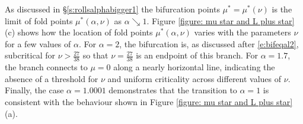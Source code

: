 \documentclass{article}
\numberwithin{equation}{section}
\begin{document}
As discussed in \S\ref{s:rollsalphabigger1} the bifurcation points $\mu^*=\mu^*(\nu)$ is the limit of fold points $\mu^*(\alpha,\nu)$ as $\alpha \searrow 1$. Figure \ref{figure: mu star and L plus star}(c) shows how the location of fold points $\mu^*(\alpha,\nu)$ varies with the parameters $\nu$ for a few values of $\alpha$. For $\alpha = 2$, the bifurcation is, as discussed after \eqref{e:bifeqal2}, subcritical for $\nu>\frac{27}{38}$ so that $\nu=\frac{27}{38}$  is an endpoint of this branch. For $\alpha = 1.7$, the branch connects to $\mu = 0$ along a nearly horizontal line, indicating the absence of a threshold for $\nu$ and uniform criticality across different values of $\nu$. Finally, the case $\alpha = 1.0001$ demonstrates that the transition to $\alpha = 1$ is consistent with the behaviour shown in Figure \ref{figure: mu star and L plus star}(a). 
		 		 
\end{document}
